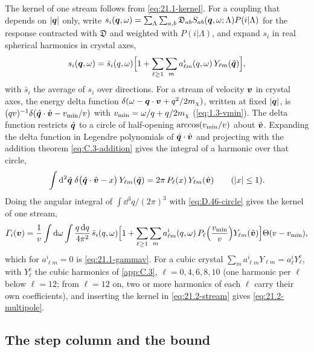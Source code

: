 The kernel of one stream follows from \cref{eq:21.1-kernel}. For a coupling that depends on $|\bm{q}|$ only, write $s_i(\bm{q},\omega) = \sum_\Lambda\sum_{a,b}\mathfrak{D}_{ab}S_{ab}(\bm{q},\omega;\Lambda)P(i|\Lambda)$ for the response contracted with $\mathfrak{D}$ and weighted with $P(i|\Lambda)$, and expand $s_i$ in real spherical harmonics in crystal axes,
\begin{equation*}
  s_i(\bm{q},\omega) = \bar s_i(q,\omega)\Bigl[1 + \sum_{\ell \ge 1}\sum_ma^i_{\ell m}(q,\omega)\,Y_{\ell m}(\hat{\bm{q}})\Bigr] ,
\end{equation*}
with $\bar s_i$ the average of $s_i$ over directions. For a stream of velocity $\bm{v}$ in crystal axes, the energy delta function $\delta(\omega - \bm{q}\cdot\bm{v} + q^2/2m_{\chi})$, written at fixed $|\bm{q}|$, is $(qv)^{-1}\delta(\hat{\bm{q}}\cdot\hat{\bm{v}} - v_{\mathrm{min}}/v)$ with $v_{\mathrm{min}} = \omega/q + q/2m_{\chi}$ (\cref{eq:1.3-vmin}). The delta function restricts $\hat{\bm{q}}$ to a circle of half-opening $\arccos(v_{\mathrm{min}}/v)$ about $\hat{\bm{v}}$. Expanding the delta function in Legendre polynomials of $\hat{\bm{q}}\cdot\hat{\bm{v}}$ and projecting with the addition theorem \cref{eq:C.3-addition} gives the integral of a harmonic over that circle,
\begin{equation}
  \int\mathrm{d}^2\hat{\bm{q}}\;\delta\bigl(\hat{\bm{q}}\cdot\hat{\bm{v}} - x\bigr)\,Y_{\ell m}(\hat{\bm{q}}) = 2\pi\,P_\ell(x)\,Y_{\ell m}(\hat{\bm{v}}) \qquad (|x| \le 1) .
  \label{eq:D.46-circle}
\end{equation}
Doing the angular integral of $\int\dd^3q/(2\pi)^3$ with \cref{eq:D.46-circle} gives the kernel of one stream,
\begin{equation*}
  \varGamma_i(\bm{v}) = \frac1v\int\mathrm{d}\omega\int\frac{q\,\mathrm{d} q}{4\pi^2}\,\bar s_i(q,\omega)\Bigl[1 + \sum_{\ell \ge 1}\sum_ma^i_{\ell m}(q,\omega)\,P_\ell\Bigl(\frac{v_{\mathrm{min}}}{v}\Bigr)Y_{\ell m}(\hat{\bm{v}})\Bigr]\Theta(v - v_{\mathrm{min}}) ,
\end{equation*}
which for $a^i_{\ell m} = 0$ is \cref{eq:21.1-gammav}. For a cubic crystal $\sum_ma^i_{\ell m}Y_{\ell m} = a^i_\ell Y^{\mathrm{c}}_\ell$, with $Y^{\mathrm{c}}_\ell$ the cubic harmonics of \cref{app:C.3}, $\ell = 0, 4, 6, 8, 10$ (one harmonic per $\ell$ below $\ell = 12$; from $\ell = 12$ on, two or more harmonics of each $\ell$ carry their own coefficients), and inserting the kernel in \cref{eq:21.2-stream} gives \cref{eq:21.2-multipole}.

\subsection{The step column and the bound}

